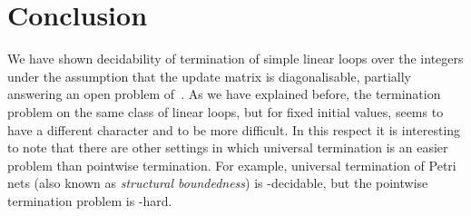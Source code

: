 \chapter{Conclusion}






We have shown decidability of termination of simple linear loops over
the integers under the assumption that the update matrix is
diagonalisable, partially answering an open problem
of~\cite{Tiw04,Bra06}.  As we have explained before, the termination
problem on the same class of linear loops, but for fixed initial
values, seems to have a different character and to be more difficult.
In this respect it is interesting to note that there are other
settings in which universal termination is an easier problem than
pointwise termination. For example, universal termination of Petri
nets (also known as \textit{structural boundedness}) is
\PTIME-decidable, but the pointwise termination problem is
\EXPSPACE-hard.

